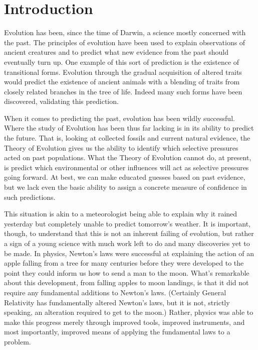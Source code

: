 \chapter{Introduction} %
\label{cha:introduction}
Evolution has been, since the time of Darwin, a science mostly concerned with the past. The principles of evolution have been used to explain observations of ancient creatures and to predict what new evidence from the past should eventually turn up. One example of this sort of prediction is the existence of transitional forms. Evolution through the gradual acquisition of altered traits would predict the existence of ancient animals with a blending of traits from closely related branches in the tree of life. Indeed many such forms have been discovered, validating this prediction.

When it comes to predicting the past, evolution has been wildly successful. Where the study of Evolution has been thus far lacking is in its ability to predict the future. That is, looking at collected fossils and current natural evidence, the Theory of Evolution gives us the ability to identify which selective pressures acted on past populations. What the Theory of Evolution cannot do, at present, is predict which environmental or other influences will act as selective pressures going forward. At best, we can make educated guesses based on past evidence, but we lack even the basic ability to assign a concrete measure of confidence in such predictions.

This situation is akin to a meteorologist being able to explain why it rained yesterday but completely unable to predict tomorrow's weather. It is important, though, to understand that this is not an inherent failing of evolution, but rather a sign of a young science with much work left to do and many discoveries yet to be made. In physics, Newton's laws were successful at explaining the action of an apple falling from a tree for many centuries before they were developed to the point they could inform us how to send a man to the moon. What's remarkable about this development, from falling apples to moon landings, is that it did not require any fundamental additions to Newton's laws. (Certainly General Relativity has fundamentally altered Newton's laws, but it is not, strictly speaking, an alteration required to get to the moon.) Rather, physics was able to make this progress merely through improved tools, improved instruments, and most importantly, improved means of applying the fundamental laws to a problem.

